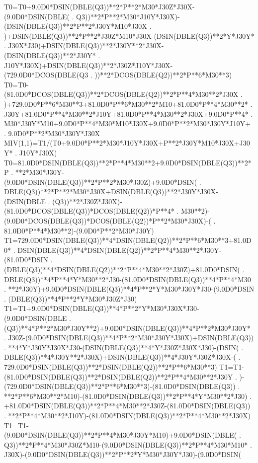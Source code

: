 \begin{framedverbatim}
      T0=T0+9.0D0*DSIN(DBLE(Q3))**2*P**2*M30*J30Z*J30X-(9.0D0*DSIN(DBLE(
     . Q3))**2*P**2*M30*J10Y*J30X)-(DSIN(DBLE(Q3))**2*P**2*J30Y*M10*J30X
     . )+DSIN(DBLE(Q3))**2*P**2*J30Z*M10*J30X-(DSIN(DBLE(Q3))**2*Y*J30Y*
     . J30X*J30)+DSIN(DBLE(Q3))**2*J30Y**2*J30X-(DSIN(DBLE(Q3))**2*J30Y*
     . J10Y*J30X)+DSIN(DBLE(Q3))**2*J30Z*J10Y*J30X-(729.0D0*DCOS(DBLE(Q3
     . ))**2*DCOS(DBLE(Q2))**2*P**6*M30**3)
      T0=T0-(81.0D0*DCOS(DBLE(Q3))**2*DCOS(DBLE(Q2))**2*P**4*M30**2*J30X
     . )+729.0D0*P**6*M30**3+81.0D0*P**6*M30**2*M10+81.0D0*P**4*M30**2*
     . J30Y+81.0D0*P**4*M30**2*J10Y+81.0D0*P**4*M30**2*J30X+9.0D0*P**4*
     . M30*J30Y*M10+9.0D0*P**4*M30*M10*J30X+9.0D0*P**2*M30*J30Y*J10Y+
     . 9.0D0*P**2*M30*J30Y*J30X
      MIV(1,1)=T1/(T0+9.0D0*P**2*M30*J10Y*J30X+P**2*J30Y*M10*J30X+J30Y*
     . J10Y*J30X)
      T0=81.0D0*DSIN(DBLE(Q3))**2*P**4*M30**2+9.0D0*DSIN(DBLE(Q3))**2*P
     . **2*M30*J30Y-(9.0D0*DSIN(DBLE(Q3))**2*P**2*M30*J30Z)+9.0D0*DSIN(
     . DBLE(Q3))**2*P**2*M30*J30X+DSIN(DBLE(Q3))**2*J30Y*J30X-(DSIN(DBLE
     . (Q3))**2*J30Z*J30X)-(81.0D0*DCOS(DBLE(Q3))*DCOS(DBLE(Q2))*P**4*
     . M30**2)-(9.0D0*DCOS(DBLE(Q3))*DCOS(DBLE(Q2))*P**2*M30*J30X)-(
     . 81.0D0*P**4*M30**2)-(9.0D0*P**2*M30*J30Y)
      T1=729.0D0*DSIN(DBLE(Q3))**4*DSIN(DBLE(Q2))**2*P**6*M30**3+81.0D0*
     . DSIN(DBLE(Q3))**4*DSIN(DBLE(Q2))**2*P**4*M30**2*J30Y-(81.0D0*DSIN
     . (DBLE(Q3))**4*DSIN(DBLE(Q2))**2*P**4*M30**2*J30Z)+81.0D0*DSIN(
     . DBLE(Q3))**4*P**4*Y*M30**2*J30-(81.0D0*DSIN(DBLE(Q3))**4*P**4*M30
     . **2*J30Y)+9.0D0*DSIN(DBLE(Q3))**4*P**2*Y*M30*J30Y*J30-(9.0D0*DSIN
     . (DBLE(Q3))**4*P**2*Y*M30*J30Z*J30)
      T1=T1+9.0D0*DSIN(DBLE(Q3))**4*P**2*Y*M30*J30X*J30-(9.0D0*DSIN(DBLE
     . (Q3))**4*P**2*M30*J30Y**2)+9.0D0*DSIN(DBLE(Q3))**4*P**2*M30*J30Y*
     . J30Z-(9.0D0*DSIN(DBLE(Q3))**4*P**2*M30*J30Y*J30X)+DSIN(DBLE(Q3))
     . **4*Y*J30Y*J30X*J30-(DSIN(DBLE(Q3))**4*Y*J30Z*J30X*J30)-(DSIN(
     . DBLE(Q3))**4*J30Y**2*J30X)+DSIN(DBLE(Q3))**4*J30Y*J30Z*J30X-(
     . 729.0D0*DSIN(DBLE(Q3))**2*DSIN(DBLE(Q2))**2*P**6*M30**3)
      T1=T1-(81.0D0*DSIN(DBLE(Q3))**2*DSIN(DBLE(Q2))**2*P**4*M30**2*J30Y
     . )-(729.0D0*DSIN(DBLE(Q3))**2*P**6*M30**3)-(81.0D0*DSIN(DBLE(Q3))
     . **2*P**6*M30**2*M10)-(81.0D0*DSIN(DBLE(Q3))**2*P**4*Y*M30**2*J30)
     . +81.0D0*DSIN(DBLE(Q3))**2*P**4*M30**2*J30Z-(81.0D0*DSIN(DBLE(Q3))
     . **2*P**4*M30**2*J10Y)-(81.0D0*DSIN(DBLE(Q3))**2*P**4*M30**2*J30X)
      T1=T1-(9.0D0*DSIN(DBLE(Q3))**2*P**4*M30*J30Y*M10)+9.0D0*DSIN(DBLE(
     . Q3))**2*P**4*M30*J30Z*M10-(9.0D0*DSIN(DBLE(Q3))**2*P**4*M30*M10*
     . J30X)-(9.0D0*DSIN(DBLE(Q3))**2*P**2*Y*M30*J30Y*J30)-(9.0D0*DSIN(

\end{framedverbatim}
